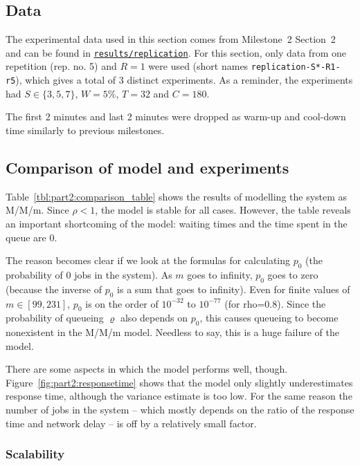 \documentclass[11pt]{article}
\begin{document}
\subsection{Data}

The experimental data used in this section comes from Milestone~2 Section~2 and can be found in \texttt{\href{https://gitlab.inf.ethz.ch/pungast/asl-fall16-project/tree/master/results/replication}{results/replication}}. For this section, only data from one repetition (rep. no. 5) and $R=1$ were used (short names \texttt{replication-S*-R1-r5}), which gives a total of 3 distinct experiments. As a reminder, the experiments had $S \in \{3,5,7\}$, $W=5\%$, $T=32$ and $C=180$.

The first 2 minutes and last 2 minutes were dropped as warm-up and cool-down time similarly to previous milestones.

\subsection{Comparison of model and experiments}



Table~\ref{tbl:part2:comparison_table} shows the results of modelling the system as M/M/m. Since $\rho < 1$, the model is stable for all cases. However, the table reveals an important shortcoming of the model: waiting times and the time spent in the queue are 0.

The reason becomes clear if we look at the formulas for calculating $p_0$ (the probability of 0 jobs in the system). As $m$ goes to infinity, $p_0$ goes to zero (because the inverse of $p_0$ is a sum that goes to infinity). Even for finite values of $m \in [99, 231]$, $p_0$ is on the order of $10^{-32}$ to $10^{-77}$ (for rho=0.8). Since the probability of queueing $\varrho$ also depends on $p_0$, this causes queueing to become nonexistent in the M/M/m model. Needless to say, this is a huge failure of the model.

There are some aspects in which the model performs well, though. Figure~\ref{fig:part2:responsetime} shows that the model only slightly underestimates response time, although the variance estimate is too low. For the same reason the number of jobs in the system -- which mostly depends on the ratio of the response time and network delay -- is off by a relatively small factor.

\subsubsection{Scalability}
\end{document}
